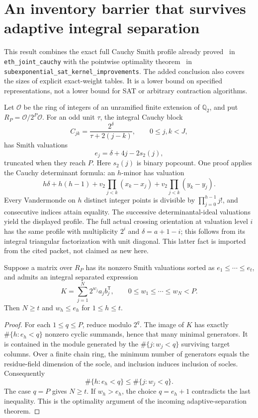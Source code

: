 \section{An inventory barrier that survives adaptive integral separation}
\label{sec:adaptive-inventory-barrier}

This result combines the exact full Cauchy Smith profile already proved~\cite{joint} in
\texttt{eth\_joint\_cauchy} with the pointwise optimality theorem~\cite{kernel} in
\texttt{subexponential\_sat\_kernel\_improvements}.  The added conclusion
also covers the sizes of explicit exact-weight tables.  It is a lower bound
on specified representations, not a lower bound for SAT or arbitrary
contraction algorithms.

Let $\mathcal O$ be the ring of integers of an unramified finite extension
of $\mathbb Q_2$, and put $R_P=\mathcal O/2^P\mathcal O$.
For an odd unit $\tau$, the integral Cauchy block
\[
 C_{jk}=\frac{2^\delta}{\tau+2(j-k)},\qquad 0\le j,k<J,
\]
has Smith valuations
\[
 e_j=\delta+4j-2s_2(j),
\]
truncated when they reach $P$.  Here $s_2(j)$ is binary popcount.
One proof applies the Cauchy determinant formula: an $h$-minor has
valuation
\[
 h\delta+h(h-1)+
 v_2\!\prod_{j<k}(x_k-x_j)+v_2\!\prod_{j<k}(y_k-y_j).
\]
Every Vandermonde on $h$ distinct integer points is divisible by
$\prod_{j=0}^{h-1}j!$, and consecutive indices attain equality.  The
successive determinantal-ideal valuations yield the displayed profile.
The full actual crossing orientation at valuation level $i$ has the same
profile with multiplicity $2^i$ and
$\delta=a+1-i$; this follows from its integral triangular factorization
with unit diagonal.  This latter fact is imported from the cited packet,
not claimed as new here.

\begin{lemma}
\label{lem:profile-barrier}
Suppose a matrix over $R_P$ has its nonzero Smith valuations sorted as
$e_1\le\cdots\le e_t$, and admits an integral separated expression
\[
 K=\sum_{j=1}^{N}2^{w_j}a_jb_j^{\mathsf T},\qquad
 0\le w_1\le\cdots\le w_N<P.
\]
Then $N\ge t$ and $w_h\le e_h$ for $1\le h\le t$.
\end{lemma}
\begin{proof}
For each $1\le q\le P$, reduce modulo $2^q$.  The image of $K$ has
exactly $\#\{h:e_h<q\}$ nonzero cyclic summands, hence that many minimal
generators.  It is contained in the module generated by the
$\#\{j:w_j<q\}$ surviving target columns.  Over a finite chain ring,
the minimum number of generators equals the residue-field dimension of
the socle, and inclusion induces inclusion of socles.  Consequently
\[
 \#\{h:e_h<q\}\le\#\{j:w_j<q\}.
\]
The case $q=P$ gives $N\ge t$.  If $w_h>e_h$, the choice
$q=e_h+1$ contradicts the last inequality.  This is the optimality
argument of the incoming adaptive-separation theorem.
\end{proof}

